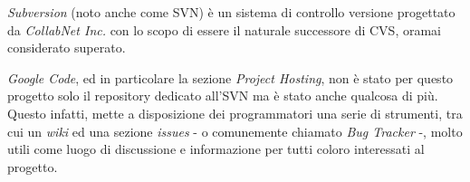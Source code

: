 \emph{Subversion} (noto anche come SVN) è un sistema di controllo versione progettato da \textit{CollabNet Inc.} con lo scopo di essere il naturale successore di CVS, oramai considerato superato.

\textit{Google Code}, ed in particolare la sezione \textit{Project Hosting}, non è stato per questo progetto solo il repository dedicato all'SVN ma è stato anche qualcosa di più. Questo infatti, mette a disposizione dei programmatori una serie di strumenti, tra cui un \textit{wiki} ed una sezione \textit{issues} - o comunemente chiamato \emph{Bug Tracker} -, molto utili come luogo di discussione e informazione per tutti coloro interessati al progetto.

